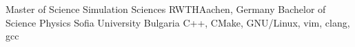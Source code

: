 {Master of Science}
{Simulation Sciences}
{RWTH}{Aachen, Germany}
{Bachelor of Science}
{Physics}
{Sofia University}
{Bulgaria}
C++, CMake, GNU/Linux, vim, clang, gcc
